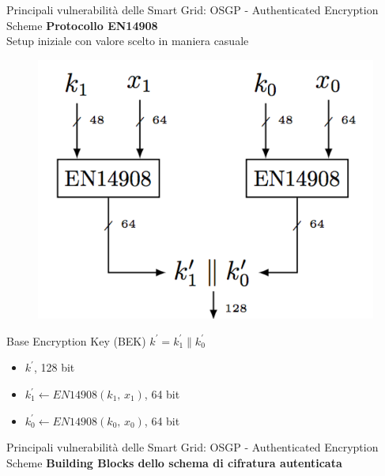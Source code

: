 \begin{frame}{Principali vulnerabilità delle Smart Grid: OSGP - Authenticated Encryption Scheme}
	\textbf{Protocollo EN14908}\\
	Setup iniziale con valore scelto in maniera casuale
	\begin{figure}[h] 
		\includegraphics[scale=0.3,cfbox=blue_slides 1pt 0pt]{imgs/EN14908.png}
	\end{figure}
	Base Encryption Key (BEK) $k^{\prime} = k_1^{\prime} \| k_0^{\prime}$
		\begin{itemize}
			\item $k^{\prime}$, 128 bit
			\item $k_1^{\prime} \gets EN14908(k_1,\,x_1)$, 64 bit
			\item $k_0^{\prime} \gets EN14908(k_0,\,x_0)$, 64 bit
		\end{itemize}
\end{frame}

\begin{frame}{Principali vulnerabilità delle Smart Grid: OSGP - Authenticated Encryption Scheme}
	\textbf{Building Blocks dello schema di cifratura autenticata}
\end{frame}


